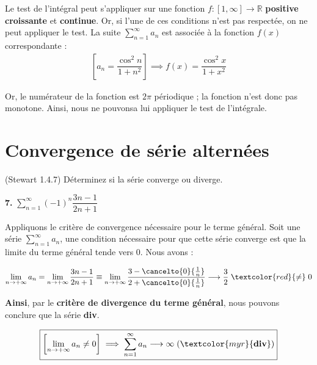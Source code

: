 \documentclass{report}
\begin{document}
    Le test de l'intégral peut s'appliquer sur une fonction 
    $f : [1, \infty] \rightarrow \mathbb{R}$ \textbf{positive} 
    \textbf{croissante} et \textbf{continue}. Or, si l'une de ces conditions n'est pas 
    respectée, on ne peut appliquer le test. La suite  
    $\sum_{n=1}^{\infty }a_n$ est associée à la fonction $f(x)$ correspondante :
    \begin{align*}
        \left[ a_n = \dfrac{\cos^2n}{1 + n^2}  \right]
        \implies f(x) = \dfrac{\cos^2x}{1 + x^2}
    \end{align*}            

    Or, le numérateur de la fonction est $2\pi$ périodique ; 
    la fonction n'est donc pas monotone. Ainsi, nous ne pouvonsa lui appliquer 
    le test de l'intégrale. 



    \section{Convergence de série alternées}
    \begin{Exercice}{(Stewart 1.4.7)}{}
        Déterminez si la série converge ou diverge.
    \end{Exercice}

    \noindent
    \textbf{7.} $\sum_{n=1}^{\infty }(-1)^n \dfrac{3n - 1}{2n + 1}$

    Appliquons le critère de convergence nécessaire pour le terme général. 
    Soit une série $\sum_{n=1}^{\infty }a_n$, une condition nécessaire pour que 
    cette série converge est que la limite du terme général tende vers 0. 
    Nous avons : 

    \begin{align*}
        \lim\limits_{n \to+\infty }a_n  =  
        \lim\limits_{n \to+\infty } \dfrac{3n - 1}{2n + 1} \equiv
        \lim\limits_{n \to+\infty }  
        \dfrac{3 - \cancelto{0}{\frac{1}{n}}}{2 + \cancelto{0}{\frac{1}{n}}}
        \longrightarrow \dfrac{3}{2} \; \textcolor{red}{\neq} \; 0 
    \end{align*}        

    \textbf{Ainsi}, par le \textbf{critère de divergence du terme général},
    nous pouvons conclure que la série \textcolor{myr}{\textbf{div}}.   
    
    \begin{align*}
        \boxed{
        \left[  \lim\limits_{n \to+\infty }a_n \neq 0  \right]
        \implies \sum_{n=1}^{\infty }a_n \longrightarrow \infty \; 
        (\textcolor{myr}{\textbf{div}} )
    }
    \end{align*}
\end{document}
